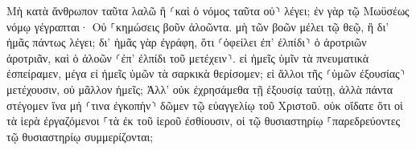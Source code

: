 \documentclass{openreader}
\begin{document}
Μὴ κατὰ ἄνθρωπον ταῦτα λαλῶ ἢ ⸂καὶ ὁ νόμος ταῦτα οὐ⸃ λέγει; 
ἐν γὰρ τῷ Μωϋσέως νόμῳ γέγραπται· Οὐ ⸀κημώσεις βοῦν ἀλοῶντα. μὴ τῶν βοῶν μέλει τῷ θεῷ, 
ἢ δι’ ἡμᾶς πάντως λέγει; δι’ ἡμᾶς γὰρ ἐγράφη, ὅτι ⸂ὀφείλει ἐπ’ ἐλπίδι⸃ ὁ ἀροτριῶν ἀροτριᾶν, καὶ ὁ ἀλοῶν ⸂ἐπ’ ἐλπίδι τοῦ μετέχειν⸃. 
εἰ ἡμεῖς ὑμῖν τὰ πνευματικὰ ἐσπείραμεν, μέγα εἰ ἡμεῖς ὑμῶν τὰ σαρκικὰ θερίσομεν; 
εἰ ἄλλοι τῆς ⸂ὑμῶν ἐξουσίας⸃ μετέχουσιν, οὐ μᾶλλον ἡμεῖς; Ἀλλ’ οὐκ ἐχρησάμεθα τῇ ἐξουσίᾳ ταύτῃ, ἀλλὰ πάντα στέγομεν ἵνα μή ⸂τινα ἐγκοπὴν⸃ δῶμεν τῷ εὐαγγελίῳ τοῦ Χριστοῦ. 
οὐκ οἴδατε ὅτι οἱ τὰ ἱερὰ ἐργαζόμενοι ⸀τὰ ἐκ τοῦ ἱεροῦ ἐσθίουσιν, οἱ τῷ θυσιαστηρίῳ ⸀παρεδρεύοντες τῷ θυσιαστηρίῳ συμμερίζονται; 
\end{document}
